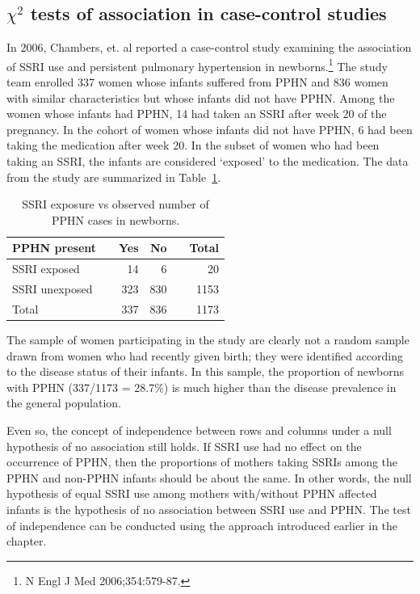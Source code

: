 \subsection{$\chi^2$ tests of association in case-control studies}
\label{caseControlTests}


In 2006, Chambers, et. al reported a case-control study examining the association of SSRI use and persistent pulmonary hypertension in newborns.\footnote{N Engl J Med 2006;354:579-87.}  The study team enrolled 337 women whose infants suffered from PPHN and 836 women with similar characteristics but whose infants did not have PPHN.  Among the women whose infants had PPHN, 14 had taken an SSRI after week 20 of the pregnancy.  In the cohort of women whose infants did not have PPHN, 6 had been taking the medication after week 20. In the subset of women who had been taking an SSRI, the infants are considered `exposed' to the medication. The data from the study are summarized in Table~\ref{ssriPPHNObserved}.

\begin{table}[h]
	\centering
	\begin{tabular}{ll rrr r}
		\hline
		PPHN present	 & \hspace{2mm} & Yes & No & \hspace{2mm} & Total \\
		\hline
		SSRI exposed &	& 14 & 6 &  & 20  \\
		SSRI unexposed & & 323 & 830 &  & 1153  \\
        Total & & 337 & 836 & & 1173 \\
		\hline
	\end{tabular}
	\caption{SSRI exposure vs observed number of PPHN cases in newborns.}
    \label{ssriPPHNObserved}
\end{table}	

The sample of women participating in the study are clearly not a random sample drawn from women who had recently given birth; they were identified according to the disease status of their infants.  In this sample, the proportion of newborns with PPHN (337/1173 = 28.7\%) is much higher than the disease prevalence in the general population.  

Even so, the concept of independence between rows and columns under a null hypothesis of no association still holds. If SSRI use had no effect on the occurrence of PPHN, then the proportions of mothers taking SSRIs among the PPHN and non-PPHN infants should be about the same. In other words, the null hypothesis of equal SSRI use among mothers with/without PPHN affected infants is the hypothesis of no association between SSRI use and PPHN. The test of independence can be conducted using the approach introduced earlier in the chapter.

